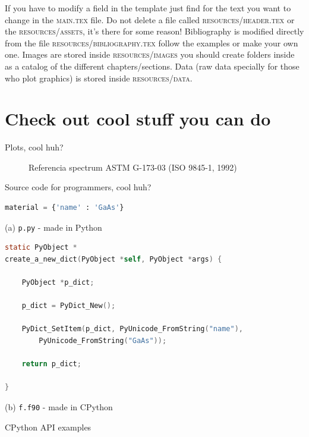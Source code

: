 \documentclass[11pt,openright,a4paper,english]{book} %
\begin{document}
If you have to modify a field in the template just find for the text you want to change in the \textsc{main.tex} file. Do not delete a file called \textsc{resources/header.tex} or the \textsc{resources/assets}, it's there for some reason! Bibliography is modified directly from the file \textsc{resources/bibliography.tex} follow the examples or make your own one. Images are stored inside \textsc{resources/images} you should create folders inside as a catalog of the different chapters/sections. Data (raw data specially for those who plot graphics) is stored inside \textsc{resources/data}.

\section{Check out cool stuff you can do}

Plots, cool huh?

\begin{figure}[H]
	\centering
	\caption{Referencia spectrum ASTM G-173-03 (ISO 9845-1, 1992)}
\end{figure}


Source code for programmers, cool huh?

\begin{sourcecode}
\centering
\begin{lstlisting}[language = Python]
material = {'name' : 'GaAs'}
\end{lstlisting}
\small {(a) \texttt{p.py} - made in Python}
\begin{lstlisting}[language = C]
static PyObject *
create_a_new_dict(PyObject *self, PyObject *args) {

	PyObject *p_dict;
	
	p_dict = PyDict_New();
	
	PyDict_SetItem(p_dict, PyUnicode_FromString("name"),
		PyUnicode_FromString("GaAs"));
		
	return p_dict;

}
\end{lstlisting}
\small {(b) \texttt{f.f90} - made in CPython}
\caption{CPython API examples}
\label{src:example_creation_of_dict_in_C_API}
\end{sourcecode}
\end{document}
